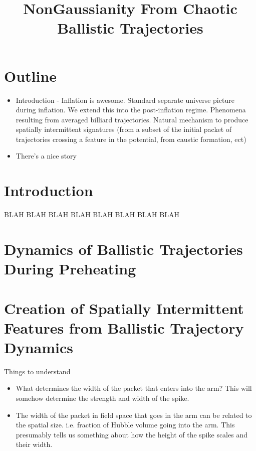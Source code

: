\documentclass[11pt,a4paper]{article}
\begin{document}
\title{NonGaussianity From Chaotic Ballistic Trajectories}

\maketitle

\section{Outline}
\begin{itemize}
\item Introduction - Inflation is awesome.  Standard separate universe picture during inflation.  We extend this into the post-inflation regime.  Phenomena resulting from averaged billiard trajectories.  Natural mechanism to produce spatially intermittent signatures (from a subset of the initial packet of trajectories crossing a feature in the potential, from caustic formation, ect)
\item There's a nice story 
\end{itemize}

\section{Introduction}
BLAH BLAH BLAH BLAH BLAH BLAH BLAH BLAH






\section{Dynamics of Ballistic Trajectories During Preheating}


\section{Creation of Spatially Intermittent Features from Ballistic Trajectory Dynamics} 
Things to understand
\begin{itemize}
\item What determines the width of the packet that enters into the arm?  This will somehow determine the strength and width of the spike.
\item The width of the packet in field space that goes in the arm can be related to the spatial size.  i.e. fraction of Hubble volume going into the arm.  This presumably tells us something about how the height of the spike scales and their width.
\end{itemize}
\end{document}
